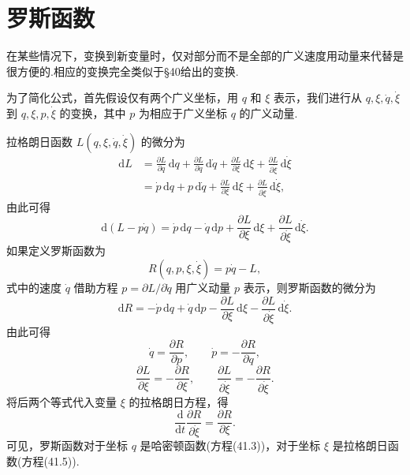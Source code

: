 \section{罗斯函数}

在某些情况下，变换到新变量时，仅对部分而不是全部的广义速度用动量来代替是很方便的.相应的变换完全类似于§40给出的变换.

为了简化公式，首先假设仅有两个广义坐标，用 $q$ 和 $\xi$
表示，我们进行从 $q,\xi,\dot{q},\dot{\xi}$ 到 $q,\xi,p,\dot{\xi}$
的变换，其中 $p$ 为相应于广义坐标 $q$ 的广义动量.

拉格朗日函数 $L(q,\xi,\dot{q},\dot{\xi})$ 的微分为
\begin{equation*}
\begin{aligned}
  \mathrm{d}L&=\frac{\partial L}{\partial q}\,\mathrm{d}q
  +\frac{\partial L}{\partial\dot{q}}\,\mathrm{d}\dot{q}
  +\frac{\partial L}{\partial\xi}\,\mathrm{d}\xi
  +\frac{\partial L}{\partial\dot{\xi}}\,\mathrm{d}\dot{\xi}\\
  &=\dot{p}\,\mathrm{d}q+p\,\mathrm{d}\dot{q}
  +\frac{\partial L}{\partial\xi}\,\mathrm{d}\xi
  +\frac{\partial L}{\partial\dot{\xi}}\,\mathrm{d}\dot{\xi},
\end{aligned}
\end{equation*}
由此可得
\begin{equation*}
  \mathrm{d}\left(L-p\dot{q}\right)=\dot{p}\,\mathrm{d}q-\dot{q}\,\mathrm{d}p
  +\frac{\partial L}{\partial\xi}\,\mathrm{d}\xi
  +\frac{\partial L}{\partial\dot{\xi}}\,\mathrm{d}\dot{\xi}.
\end{equation*}
如果定义罗斯函数为
\begin{equation}
  R(q,p,\xi,\dot{\xi})=p\dot{q}-L,
\end{equation}
式中的速度 $\dot{q}$ 借助方程 $p=\partial L/\partial\dot{q}$
用广义动量 $p$ 表示，则罗斯函数的微分为
\begin{equation}
  \mathrm{d}R=-\dot{p}\,\mathrm{d}q+\dot{q}\,\mathrm{d}p
  -\frac{\partial L}{\partial\xi}\,\mathrm{d}\xi
  -\frac{\partial L}{\partial\dot{\xi}}\,\mathrm{d}\dot{\xi}.
\end{equation}
由此可得
\begin{equation}
  \dot{q}=\frac{\partial R}{\partial p},\qquad
  \dot{p}=-\frac{\partial R}{\partial q},
\end{equation}
\begin{equation}
  \frac{\partial L}{\partial\xi}=-\frac{\partial R}{\partial\xi},\qquad
  \frac{\partial L}{\partial\dot{\xi}}=-\frac{\partial R}{\partial\dot{\xi}}.
\end{equation}
将后两个等式代入变量 $\xi$ 的拉格朗日方程，得
\begin{equation}
  \frac{\mathrm{d}}{\mathrm{d}t}\frac{\partial R}{\partial\dot{\xi}}
  =\frac{\partial R}{\partial\xi}.
\end{equation}
可见，罗斯函数对于坐标 $q$ 是哈密顿函数(方程(41.3))，对于坐标 $\xi$
是拉格朗日函数(方程(41.5)).

